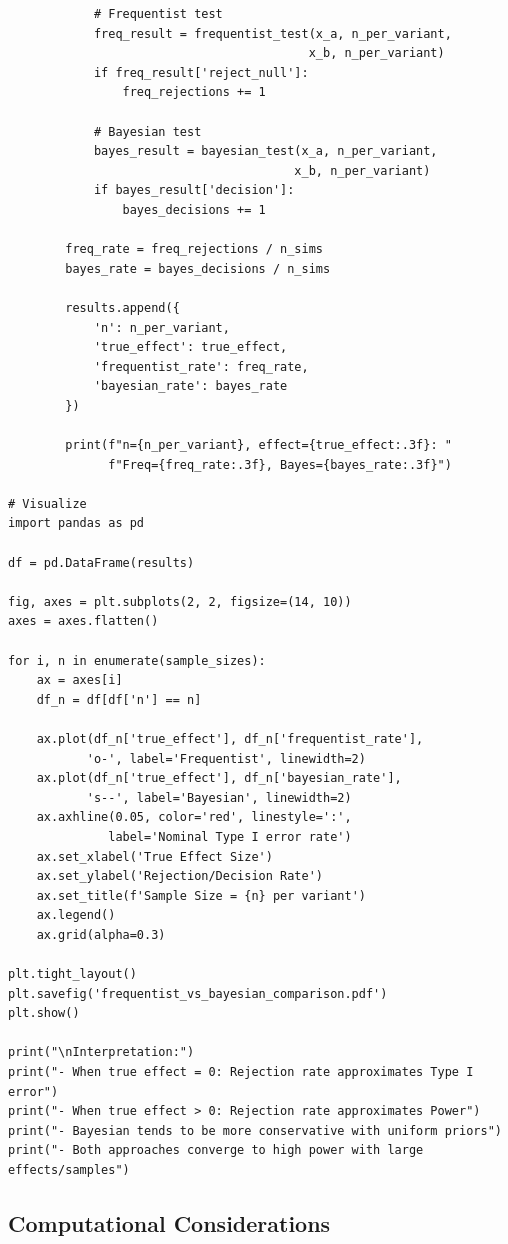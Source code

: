 \begin{lstlisting}
            # Frequentist test
            freq_result = frequentist_test(x_a, n_per_variant,
                                          x_b, n_per_variant)
            if freq_result['reject_null']:
                freq_rejections += 1

            # Bayesian test
            bayes_result = bayesian_test(x_a, n_per_variant,
                                        x_b, n_per_variant)
            if bayes_result['decision']:
                bayes_decisions += 1

        freq_rate = freq_rejections / n_sims
        bayes_rate = bayes_decisions / n_sims

        results.append({
            'n': n_per_variant,
            'true_effect': true_effect,
            'frequentist_rate': freq_rate,
            'bayesian_rate': bayes_rate
        })

        print(f"n={n_per_variant}, effect={true_effect:.3f}: "
              f"Freq={freq_rate:.3f}, Bayes={bayes_rate:.3f}")

# Visualize
import pandas as pd

df = pd.DataFrame(results)

fig, axes = plt.subplots(2, 2, figsize=(14, 10))
axes = axes.flatten()

for i, n in enumerate(sample_sizes):
    ax = axes[i]
    df_n = df[df['n'] == n]

    ax.plot(df_n['true_effect'], df_n['frequentist_rate'],
           'o-', label='Frequentist', linewidth=2)
    ax.plot(df_n['true_effect'], df_n['bayesian_rate'],
           's--', label='Bayesian', linewidth=2)
    ax.axhline(0.05, color='red', linestyle=':',
              label='Nominal Type I error rate')
    ax.set_xlabel('True Effect Size')
    ax.set_ylabel('Rejection/Decision Rate')
    ax.set_title(f'Sample Size = {n} per variant')
    ax.legend()
    ax.grid(alpha=0.3)

plt.tight_layout()
plt.savefig('frequentist_vs_bayesian_comparison.pdf')
plt.show()

print("\nInterpretation:")
print("- When true effect = 0: Rejection rate approximates Type I error")
print("- When true effect > 0: Rejection rate approximates Power")
print("- Bayesian tends to be more conservative with uniform priors")
print("- Both approaches converge to high power with large effects/samples")
\end{lstlisting}

\subsection{Computational Considerations}

